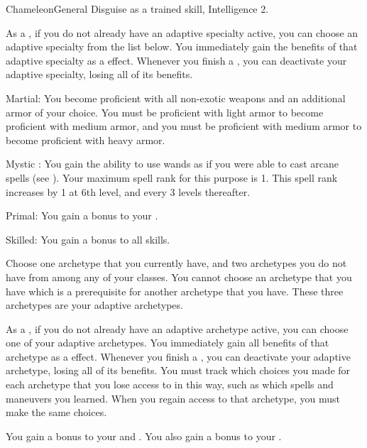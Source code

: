   \begin{feat}{Chameleon}{General}
    \featpre Disguise as a trained skill, Intelligence 2.

     As a , if you do not already have an adaptive specialty active, you can choose an adaptive specialty from the list below.
    You immediately gain the benefits of that adaptive specialty as a \atSwift effect.
    Whenever you finish a , you can deactivate your adaptive specialty, losing all of its benefits.
    \begin{raggeditemize}
      \item Martial: You become proficient with all non-exotic weapons and an additional armor  of your choice.
        You must be proficient with light armor to become proficient with medium armor, and you must be proficient with medium armor to become proficient with heavy armor.
      \item Mystic \sparkle: You gain the ability to use wands as if you were able to cast arcane spells (see ).
        Your maximum spell rank for this purpose is 1.
        This spell rank increases by 1 at 6th level, and every 3 levels thereafter.
      \item Primal: You gain a  bonus to your .
      \item Skilled: You gain a  bonus to all skills.
    \end{raggeditemize}

     Choose one archetype that you currently have, and two archetypes you do not have from among any of your classes.
    You cannot choose an archetype that you have which is a prerequisite for another archetype that you have.
    These three archetypes are your adaptive archetypes.

    As a , if you do not already have an adaptive archetype active, you can choose one of your adaptive archetypes.
    You immediately gain all benefits of that archetype as a \atSwift effect.
    Whenever you finish a , you can deactivate your adaptive archetype, losing all of its benefits.
    You must track which choices you made for each archetype that you lose access to in this way, such as which spells and maneuvers you learned.
    When you regain access to that archetype, you must make the same choices.

     You gain a  bonus to your  and .
    You also gain a  bonus to your .


\end{feat}
